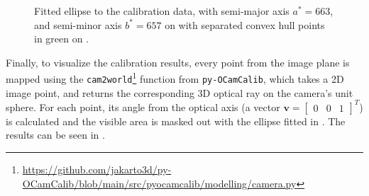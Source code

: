 \begin{figure}[H]
	\centering
	\caption{
		Fitted ellipse to the calibration data, with semi-major axis $a^* = 663$, and semi-minor axis $b^* = 657$
        on  with separated convex hull points in green on .
  }
	\label{fig:ellipse_fit}
\end{figure}

Finally, to visualize the calibration results, every point from the image plane is mapped using the
\texttt{cam2world}\footnote{\url{https://github.com/jakarto3d/py-OCamCalib/blob/main/src/pyocamcalib/modelling/camera.py}}
function from \texttt{py-OCamCalib}, which takes a 2D image point, and returns
the corresponding 3D optical ray on the camera's unit sphere. For each point, its angle from the optical axis (a vector $\mathbf{v} = \begin{bmatrix} 0 & 0 & 1 \end{bmatrix}^{T}$) is calculated and the visible area is masked out with the ellipse fitted in . The results can be seen in .

